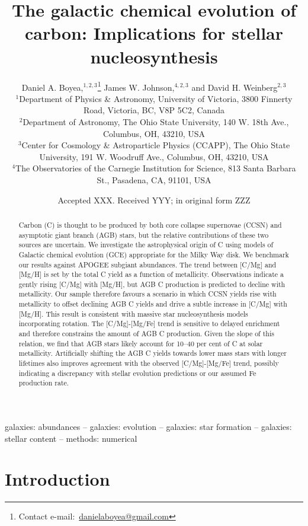 \documentclass[fleqn,
usenatbib]{mnras}
\title[The origin and galactic evolution of carbon]{The galactic chemical evolution of carbon: Implications for stellar nucleosynthesis}
\author[D. A. Boyea et. al.]{%
Daniel A. Boyea,$^{1, 2, 3}$\thanks{%
Contact e-mail:~\href{mailto:danielaboyea@gmail.com}{danielaboyea@gmail.com}}
James W. Johnson,$^{4, 2, 3}$
and
David H. Weinberg$^{2,3}$
\\
$^{1}$Department of Physics \& Astronomy, University of Victoria, 3800 Finnerty Road, Victoria, BC, V8P 5C2, Canada
\\
$^{2}$Department of Astronomy, The Ohio State University, 140 W. 18th Ave., Columbus, OH, 43210, USA
\\
$^{3}$Center for Cosmology \& Astroparticle Physics (CCAPP), The Ohio State University, 191 W. Woodruff Ave., Columbus, OH, 43210, USA\\
$^{4}$The Observatories of the Carnegie Institution for Science, 813 Santa Barbara St., Pasadena, CA, 91101, USA
}
\date{Accepted XXX. Received YYY; in original form ZZZ}
\begin{document}
\label{firstpage}
\pagerange{\pageref{firstpage}--\pageref{lastpage}}
\maketitle



\begin{abstract}
Carbon (C) is thought to be produced by both core collapse supernovae (CCSN) and asymptotic giant branch (AGB) stars, but the relative contributions of these two sources are uncertain. 
We investigate the astrophysical origin of C using models of Galactic chemical evolution (GCE) appropriate for the Milky Way disk.
We benchmark our results against APOGEE subgiant abundances.
The trend between [C/Mg] and [Mg/H] is set by the total C yield as a function of metallicity. Observations indicate a gently rising [C/Mg] with [Mg/H], but AGB C production is predicted to decline with metallicity. 
Our sample therefore favours a scenario in which CCSN yields rise with metallicity to offset declining AGB C yields and drive a subtle increase in [C/Mg] with [Mg/H].
This result is consistent with massive star nucleosynthesis models incorporating rotation.
%
The [C/Mg]-[Mg/Fe] trend is sensitive to delayed enrichment and therefore constrains the amount of AGB C production.
Given the slope of this relation, we find that AGB stars likely account for 10--40 per cent of C at solar metallicity.
Artificially shifting the AGB C yields towards lower mass stars with longer lifetimes also improves agreement with the observed [C/Mg]-[Mg/Fe] trend, possibly indicating a discrepancy with stellar evolution predictions or our assumed Fe production rate.
\end{abstract}

\begin{keywords}
galaxies: abundances -- galaxies: evolution -- galaxies: star formation -- galaxies: stellar content -- methods: numerical
\end{keywords}





\section{Introduction}
\end{document}
